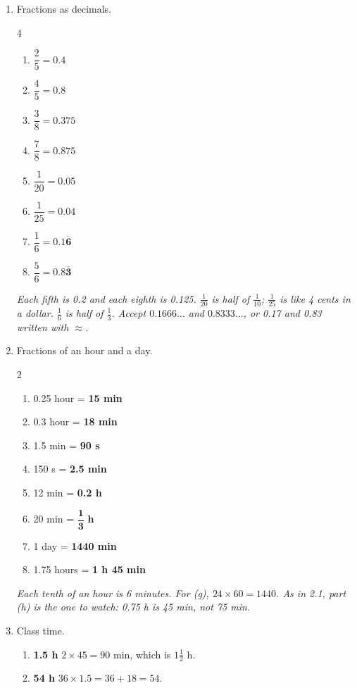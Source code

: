 \documentclass[12pt, twoside]{article}
\begin{document}
\begin{enumerate}[itemsep=0.3cm]
\newpage

\item Fractions as decimals.
  \begin{multicols}{4}
    \begin{enumerate}[itemsep=0.15cm]
      \item $\dfrac{2}{5} = \mathbf{0.4}$
      \item $\dfrac{4}{5} = \mathbf{0.8}$
      \item $\dfrac{3}{8} = \mathbf{0.375}$
      \item $\dfrac{7}{8} = \mathbf{0.875}$
      \item $\dfrac{1}{20} = \mathbf{0.05}$
      \item $\dfrac{1}{25} = \mathbf{0.04}$
      \item $\dfrac{1}{6} = \mathbf{0.1\overline{6}}$
      \item $\dfrac{5}{6} = \mathbf{0.8\overline{3}}$
    \end{enumerate}
  \end{multicols}
  \emph{Each fifth is 0.2 and each eighth is 0.125. $\frac{1}{20}$ is half of
  $\frac{1}{10}$; $\frac{1}{25}$ is like 4 cents in a dollar. $\frac{1}{6}$ is half
  of $\frac{1}{3}$. Accept $0.1666\ldots$ and $0.8333\ldots$, or 0.17 and 0.83
  written with $\approx$.}

\item Fractions of an hour and a day.
  \begin{multicols}{2}
    \begin{enumerate}[itemsep=0.1cm]
      \item 0.25 hour = \textbf{15 min}
      \item 0.3 hour = \textbf{18 min}
      \item 1.5 min = \textbf{90 s}
      \item 150 s = \textbf{2.5 min}
      \item 12 min = \textbf{0.2 h}
      \item 20 min = $\mathbf{\dfrac{1}{3}}$ \textbf{h}
      \item 1 day = \textbf{1440 min}
      \item 1.75 hours = \textbf{1 h 45 min}
    \end{enumerate}
  \end{multicols}
  \emph{Each tenth of an hour is 6 minutes. For (g), $24 \times 60 = 1440$. As in
  2.1, part (h) is the one to watch: 0.75 h is 45 min, not 75 min.}

\item Class time.
  \begin{enumerate}[itemsep=0.1cm]
    \item \textbf{1.5 h} \quad $2 \times 45 = 90$ min, which is $1\frac{1}{2}$ h.
    \item \textbf{54 h} \quad $36 \times 1.5 = 36 + 18 = 54$.
  \end{enumerate}


\end{enumerate}
\end{document}
